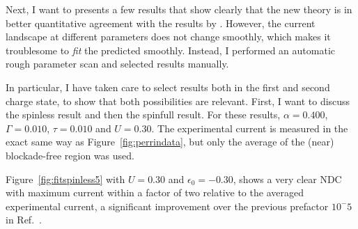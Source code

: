 Next, I want to presents a few results that show clearly that the new theory is in better quantitative agreement with the results by \citet{perrinnano}. However, the current landscape at different parameters does not change smoothly, which makes it troublesome to \emph{fit} the predicted smoothly. Instead, I performed an automatic rough parameter scan and selected results manually.

In particular, I have taken care to select results both in the first and second charge state, to show that both possibilities are relevant. First, I want to discuss the spinless result and then the spinfull result. For these results, $\alpha=0.400$, $\Gamma=0.010$, $\tau=0.010$ and $U=0.30$. The experimental current is measured in the exact same way as Figure~\ref{fig:perrindata}, but only the average of the (near) blockade-free region was used.

Figure~\ref{fig:fitspinless5} with $U=0.30$ and $\epsilon_0=-0.30$, shows a very clear NDC with maximum current within a factor of two relative to the averaged experimental current, a significant improvement over the previous prefactor $10^-5$ in Ref.~\cite{perrinnano}.


